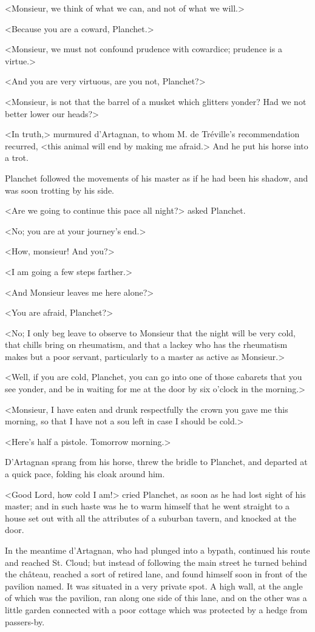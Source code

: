 <Monsieur, we think of what we can, and not of what we will.> 

<Because you are a coward, Planchet.> 

<Monsieur, we must not confound prudence with cowardice; prudence is a virtue.> 

<And you are very virtuous, are you not, Planchet?> 

<Monsieur, is not that the barrel of a musket which glitters yonder? Had we not better lower our heads?> 

<In truth,> murmured d'Artagnan, to whom M. de Tréville's recommendation recurred, <this animal will end by making me afraid.> And he put his horse into a trot. 

Planchet followed the movements of his master as if he had been his shadow, and was soon trotting by his side. 

<Are we going to continue this pace all night?> asked Planchet. 

<No; you are at your journey's end.> 

<How, monsieur! And you?> 

<I am going a few steps farther.> 

<And Monsieur leaves me here alone?> 

<You are afraid, Planchet?> 

<No; I only beg leave to observe to Monsieur that the night will be very cold, that chills bring on rheumatism, and that a lackey who has the rheumatism makes but a poor servant, particularly to a master as active as Monsieur.> 

<Well, if you are cold, Planchet, you can go into one of those cabarets that you see yonder, and be in waiting for me at the door by six o'clock in the morning.> 

<Monsieur, I have eaten and drunk respectfully the crown you gave me this morning, so that I have not a sou left in case I should be cold.> 

<Here's half a pistole. Tomorrow morning.> 

D'Artagnan sprang from his horse, threw the bridle to Planchet, and departed at a quick pace, folding his cloak around him. 

<Good Lord, how cold I am!> cried Planchet, as soon as he had lost sight of his master; and in such haste was he to warm himself that he went straight to a house set out with all the attributes of a suburban tavern, and knocked at the door. 

In the meantime d'Artagnan, who had plunged into a bypath, continued his route and reached St. Cloud; but instead of following the main street he turned behind the château, reached a sort of retired lane, and found himself soon in front of the pavilion named. It was situated in a very private spot. A high wall, at the angle of which was the pavilion, ran along one side of this lane, and on the other was a little garden connected with a poor cottage which was protected by a hedge from passers-by. 

